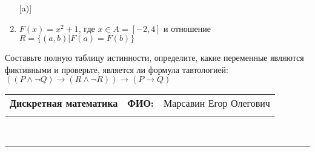 \documentclass[10pt]{exam}
\newcommand{\class}{Дискретная математика}
\newcommand{\examdate}{}
\begin{document}
\begin{questions}
\begin{enumerate} [a)]
\item $F(x)=x^{2}+1$, где $x \in A = [-2, 4]$ и отношение $R = \{(a,b)|F(a) = F(b)\}$
\end{enumerate}\question Составьте полную таблицу истинности, определите, какие переменные являются фиктивными и проверьте, является ли формула тавтологией:
$(( P \land \neg Q) \rightarrow (R \land \neg R)) \rightarrow (P \rightarrow Q)$

\end{questions}
\newpage
\begin{flushright}
\begin{tabular}{p{2.8in} r l}
\textbf{\class} & \textbf{ФИО:} &Марсавин Егор Олегович
\\

\textbf{\examdate} &&\\
\end{tabular}\\
\end{flushright}
\rule[1ex]{\textwidth}{.1pt}
\end{document}
